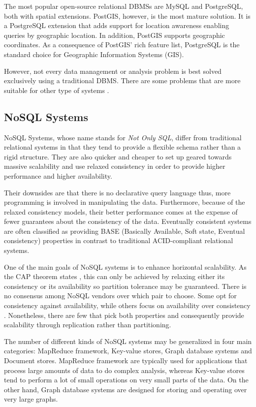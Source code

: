 The most popular open-source relational DBMSs are MySQL and PostgreSQL, both with spatial extensions. PostGIS, however, is the most mature solution. It is a PostgreSQL extension that adds support for location awareness enabling queries by geographic location. In addition, PostGIS supports geographic coordinates. As a consequence of PostGIS' rich feature list, PostgreSQL is the standard choice for Geographic Information Systems (GIS).

However, not every data management or analysis problem is best solved exclusively using a traditional DBMS. There are some problems that are more suitable for other type of systems \cite{NoSQL-use-cases}.

\subsection{NoSQL Systems}

NoSQL Systems, whose name stands for \textit{Not Only SQL}, differ from traditional relational systems in that they tend to provide a flexible schema rather than a rigid structure. They are also quicker and cheaper to set up geared towards massive scalability and use relaxed consistency in order to provide higher performance and higher availability.

Their downsides are that there is no declarative query language thus, more programming is involved in manipulating the data. Furthermore, because of the relaxed consistency models, their better performance comes at the expense of fewer guarantees about the consistency of the data. Eventually consistent systems are often classified as providing BASE (Basically Available, Soft state, Eventual consistency) properties in contrast to traditional ACID-compliant relational systems.

One of the main goals of NoSQL systems is to enhance horizontal scalability. As the CAP theorem states \cite{CAP-theorem}\cite{CAP:online}, this can only be achieved by relaxing either its consistency or its availability so partition tolerance may be guaranteed. There is no consensus among NoSQL vendors over which pair to choose. Some opt for consistency against availability, while others focus on availability over consistency \cite{CAP-NoSQL}. Nonetheless, there are few that pick both properties and consequently provide scalability through replication rather than partitioning.

The number of different kinds of NoSQL systems may be generalized in four main categories: MapReduce framework, Key-value stores, Graph database systems and Document stores. MapReduce framework are typically used for applications that process large amounts of data to do complex analysis, whereas Key-value stores tend to perform a lot of small operations on very small parts of the data. On the other hand, Graph database systems are designed for storing and operating over very large graphs.

